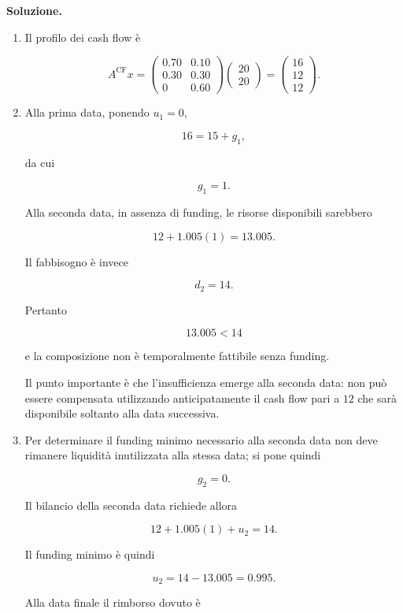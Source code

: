 \noindent
\textbf{Soluzione.}

\begin{enumerate}

\item Il profilo dei cash flow \`e

\[
A^{\mathrm{CF}}x
=
\begin{pmatrix}
0.70 & 0.10\\
0.30 & 0.30\\
0    & 0.60
\end{pmatrix}
\begin{pmatrix}
20\\
20
\end{pmatrix}
=
\begin{pmatrix}
16\\
12\\
12
\end{pmatrix}.
\]

\item Alla prima data, ponendo $u_1=0$,

\[
16=15+g_1,
\]

da cui

\[
g_1=1.
\]

Alla seconda data, in assenza di funding, le risorse disponibili sarebbero

\[
12+1.005(1)
=
13.005.
\]

Il fabbisogno \`e invece

\[
d_2=14.
\]

Pertanto

\[
13.005<14
\]

e la composizione non \`e temporalmente fattibile senza funding.

Il punto importante \`e che l'insufficienza emerge alla seconda data:
non pu\`o essere compensata utilizzando anticipatamente il cash flow pari a
$12$ che sar\`a disponibile soltanto alla data successiva.

\item Per determinare il funding minimo necessario alla seconda data non deve
rimanere liquidit\`a inutilizzata alla stessa data; si pone quindi

\[
g_2=0.
\]

Il bilancio della seconda data richiede allora

\[
12
+
1.005(1)
+
u_2
=
14.
\]

Il funding minimo \`e quindi

\[
u_2
=
14-13.005
=
0.995.
\]

Alla data finale il rimborso dovuto \`e


\end{enumerate}
